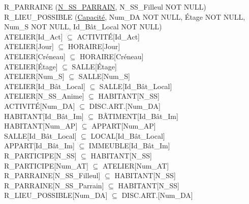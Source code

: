\documentclass[a4paper,10.5pt]{report}
\begin{document}
	R\_PARRAINE (\underline{N\_SS\_PARRAIN}, N\_SS\_Filleul NOT NULL) \\

	R\_LIEU\_POSSIBLE (\underline{Capacité}, Num\_DA NOT NULL, Étage NOT NULL, Num\_S NOT NULL, Id\_Bât\_Local NOT NULL) \\

	ATELIER[Id\_Act] $\subseteq$ ACTIVITÉ[Id\_Act] \\

	ATELIER[Jour] $\subseteq$ HORAIRE[Jour] \\

	ATELIER[Créneau] $\subseteq$ HORAIRE[Créneau] \\

	ATELIER[Étage] $\subseteq$ SALLE[Étage] \\

	ATELIER[Num\_S] $\subseteq$ SALLE[Num\_S] \\

	ATELIER[Id\_Bât\_Local] $\subseteq$ SALLE[Id\_Bât\_Local] \\

	ATELIER[N\_SS\_Anime] $\subseteq$ HABITANT[N\_SS] \\

	ACTIVITÉ[Num\_DA] $\subseteq$ DISC.ART.[Num\_DA] \\

	HABITANT[Id\_Bât\_Im] $\subseteq$ BÂTIMENT[Id\_Bât\_Im] \\

	HABITANT[Num\_AP] $\subseteq$ APPART[Num\_AP] \\

	SALLE[Id\_Bât\_Local] $\subseteq$ LOCAL[Id\_Bât\_Local] \\

	APPART[Id\_Bât\_Im] $\subseteq$ IMMEUBLE[Id\_Bât\_Im] \\

	R\_PARTICIPE[N\_SS]  $\subseteq$ HABITANT[N\_SS] \\

	R\_PARTICIPE[Num\_AT] $\subseteq$ ATELIER[Num\_AT] \\

	R\_PARRAINE[N\_SS\_Filleul] $\subseteq$ HABITANT[N\_SS] \\

	R\_PARRAINE[N\_SS\_Parrain] $\subseteq$ HABITANT[N\_SS] \\

	R\_LIEU\_POSSIBLE[Num\_DA] $\subseteq$ DISC.ART.[Num\_DA] \\
\end{document}
